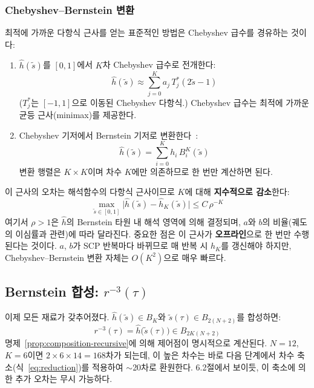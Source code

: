 \documentclass[11pt]{article}
\begin{document}
\subsubsection{Chebyshev--Bernstein 변환}

최적에 가까운 다항식 근사를 얻는 표준적인 방법은
Chebyshev 급수를 경유하는 것이다:
\begin{enumerate}
  \item $\hat{h}(\tilde{s})$를 $[0,1]$에서 $K$차 Chebyshev 급수로 전개한다:
    \begin{equation}
      \hat{h}(\tilde{s}) \approx \sum_{j=0}^K a_j \, T_j^*(2\tilde{s}-1)
      \label{eq:chebyshev}
    \end{equation}
    ($T_j^*$는 $[-1,1]$으로 이동된 Chebyshev 다항식.)
    Chebyshev 급수는 최적에 가까운 균등 근사(minimax)를 제공한다.
  \item Chebyshev 기저에서 Bernstein 기저로 변환한다~\cite{farouki2012bernstein}:
    \begin{equation}
      \hat{h}(\tilde{s}) = \sum_{i=0}^K h_i \, B_i^K(\tilde{s})
      \label{eq:h-bernstein}
    \end{equation}
    변환 행렬은 $K \times K$이며 차수 $K$에만 의존하므로 한 번만 계산하면 된다.
\end{enumerate}

이 근사의 오차는 해석함수의 다항식 근사이므로 $K$에 대해 \textbf{지수적으로 감소}한다:
\begin{equation}
  \max_{\tilde{s} \in [0,1]} \bigl|\hat{h}(\tilde{s}) - \hat{h}_K(\tilde{s})\bigr|
  \leq C \, \rho^{-K}
  \label{eq:exponential-convergence}
\end{equation}
여기서 $\rho > 1$은 $\hat{h}$의 Bernstein 타원 내 해석 영역에 의해 결정되며,
$a$와 $b$의 비율(궤도의 이심률과 관련)에 따라 달라진다.
중요한 점은 이 근사가 \textbf{오프라인}으로 한 번만 수행된다는 것이다.
$a$, $b$가 SCP 반복마다 바뀌므로 매 반복 시 $h_K$를 갱신해야 하지만,
Chebyshev--Bernstein 변환 자체는 $O(K^2)$으로 매우 빠르다.

\subsection{Bernstein 합성: $r^{-3}(\tau)$}

이제 모든 재료가 갖추어졌다.
$\hat{h}(\tilde{s}) \in B_K$와 $\tilde{s}(\tau) \in B_{2(N+2)}$를 합성하면:
\begin{equation}
  r^{-3}(\tau) = \hat{h}\bigl(\tilde{s}(\tau)\bigr) \in B_{2K(N+2)}
  \label{eq:rinv3-composed}
\end{equation}
명제~\ref{prop:composition-recursive}에 의해 제어점이 명시적으로 계산된다.
$N=12$, $K=6$이면 $2 \times 6 \times 14 = 168$차가 되는데,
이 높은 차수는 바로 다음 단계에서 차수 축소(식~\eqref{eq:reduction})를 적용하여
$\sim$20차로 환원한다.
6.2절에서 보이듯, 이 축소에 의한 추가 오차는 무시 가능하다.
\end{document}
